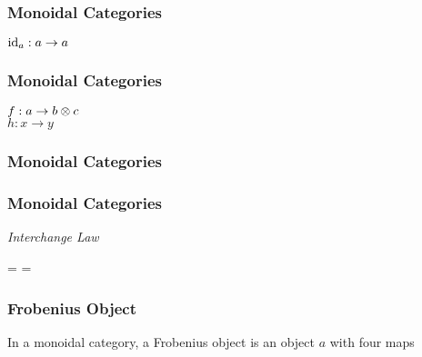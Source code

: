 \begin{frame}
    \frametitle{Monoidal Categories}

    \begin{center}
        $\operatorname{id}_a: a \to a$ \\ \vspace{0.5em}
        
    \end{center}
\end{frame}

\begin{frame}
    \frametitle{Monoidal Categories}

    \begin{center}
        $f: a \to b \otimes c$ \\
        $h: x \to y$ \\ \vspace{0.5em}
    \end{center}
\end{frame}

\begin{frame}
    \frametitle{Monoidal Categories}

    \begin{center}
    \end{center}
\end{frame}

\begin{frame}
    \frametitle{Monoidal Categories}

    \begin{center}
        \textit{Interchange Law} \\ \vspace{0.5em}
        
        = 
        = 
    \end{center}
\end{frame}



\begin{frame}
    \frametitle{Frobenius Object}

    In a monoidal category, a Frobenius object is an object $a$ with four maps
    \begin{center}
        
    \end{center}
\end{frame}



